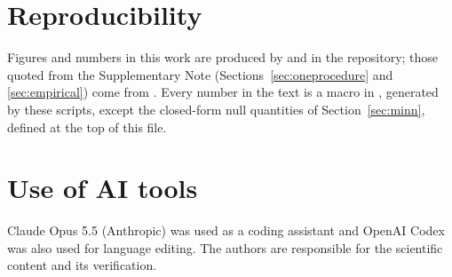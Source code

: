 \documentclass[11pt,a4paper]{article}
\theoremstyle{plain}
\theoremstyle{remark}
\begin{document}
\section*{Reproducibility}
Figures and numbers in this work are produced by
 and
 in the  repository; those
quoted from the Supplementary Note (Sections~\ref{sec:oneprocedure} and \ref{sec:empirical}) come
from . Every number in the text is a macro in
, generated by these scripts, except the closed-form null quantities of Section~\ref{sec:minn}, defined at the top of this file.

\section*{Use of AI tools}
Claude Opus 5.5 (Anthropic) was used as a coding assistant and OpenAI Codex was also used for language editing. The authors are responsible for the scientific content and its verification.
\end{document}
